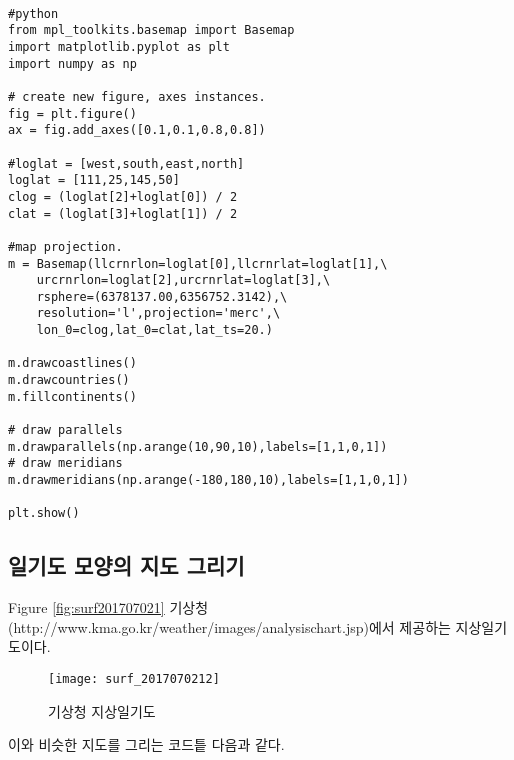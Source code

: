 \begin{code}
	\begin{lstlisting}

#python 
from mpl_toolkits.basemap import Basemap
import matplotlib.pyplot as plt
import numpy as np

# create new figure, axes instances.
fig = plt.figure()
ax = fig.add_axes([0.1,0.1,0.8,0.8])

#loglat = [west,south,east,north]
loglat = [111,25,145,50]
clog = (loglat[2]+loglat[0]) / 2
clat = (loglat[3]+loglat[1]) / 2

#map projection.
m = Basemap(llcrnrlon=loglat[0],llcrnrlat=loglat[1],\
	urcrnrlon=loglat[2],urcrnrlat=loglat[3],\
	rsphere=(6378137.00,6356752.3142),\
	resolution='l',projection='merc',\
	lon_0=clog,lat_0=clat,lat_ts=20.)

m.drawcoastlines()
m.drawcountries()
m.fillcontinents()

# draw parallels
m.drawparallels(np.arange(10,90,10),labels=[1,1,0,1])
# draw meridians
m.drawmeridians(np.arange(-180,180,10),labels=[1,1,0,1])

plt.show()

		\end{lstlisting}
\end{code}

\subsection{일기도 모양의 지도 그리기}

Figure \ref{fig:surf201707021} \은 기상청(http://www.kma.go.kr/weather/images/analysischart.jsp)에서 제공하는 지상일기도이다. 

\begin{figure}[h]
	\centering
	\texttt{[image: surf\_2017070212]}
	\caption{기상청 지상일기도}
	\label{fig:surf2017070212}
\end{figure}

이와 비슷한 지도를 그리는 코드틑 다음과 같다.

